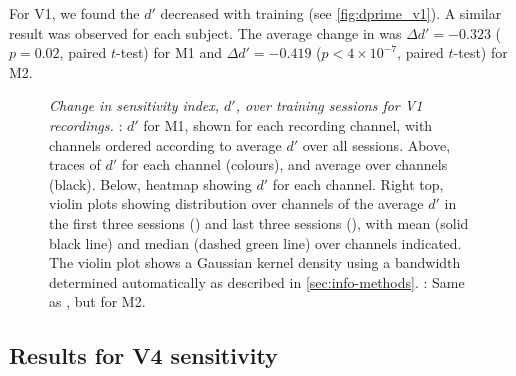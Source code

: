 
For \ac{V1}, we found the $d'$ decreased with training (see \autoref{fig:dprime_v1}).
A similar result was observed for each subject.
The average change in was $\Delta d' = -0.323$ ($p=0.02$, paired $t$-test) for \ac{M1} and $\Delta d' = -0.419$ ($p < 4 \times 10 ^{-7}$, paired $t$-test) for \ac{M2}.
 
\begin{figure}[htbp]
    \centering
    \hspace*{\fill}
    \hspace*{\fill}\hspace{.2cm}\hspace*{\fill}
    \hspace*{\fill}
    \caption{\textit{Change in sensitivity index, $d'$, over training sessions for \ac{V1} recordings.}
\protect{}: $d'$ for \ac{M1}, shown for each recording channel, with channels ordered according to average $d'$ over all sessions.
Above, traces of $d'$ for each channel (colours), and average over channels (black).
Below, heatmap showing $d'$ for each channel.
Right top, violin plots showing distribution over channels of the average $d'$ in the first three sessions () and last three sessions (), with mean (solid black line) and median (dashed green line) over channels indicated.
The violin plot shows a Gaussian kernel density using a bandwidth determined automatically as described in \autoref{sec:info-methods}.
\protect{}: Same as \protect{}, but for \ac{M2}.
}
    \label{fig:dprime_v1}
\end{figure}


\subsection{Results for \acs{V4} sensitivity}
\label{sec:pl_dprime_v4}


